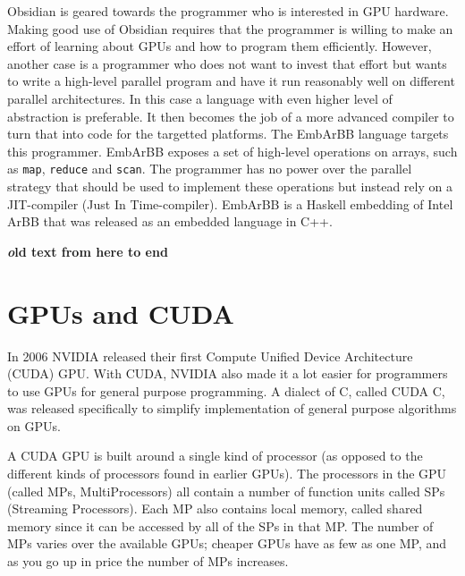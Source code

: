 \documentclass[a4paper]{book}
\begin{document}
Obsidian is geared towards the programmer who is interested in GPU hardware. Making 
good use of Obsidian requires that the programmer is willing to make an effort 
of learning about GPUs and how to program them efficiently. However, another case 
is a programmer who does not want to invest that effort but wants to write a high-level 
parallel program and have it run reasonably well on different parallel architectures. 
In this case a language with even higher level of abstraction is preferable. It then 
becomes the job of a more advanced compiler to turn that into code for the targetted 
platforms. The EmbArBB language targets this programmer. EmbArBB exposes a set of high-level 
operations on arrays, such as {\tt map}, {\tt reduce} and {\tt scan}. The programmer 
has no power over the parallel strategy that should be used to implement these 
operations but instead rely on a JIT-compiler (Just In Time-compiler). EmbArBB is a 
Haskell embedding of Intel ArBB that was released as an embedded language in C++. 


{\bf {\emph old text from here to end}}


%
%
\section{GPUs and CUDA} 

In 2006 NVIDIA released their first Compute Unified Device Architecture (CUDA) 
GPU. With CUDA, NVIDIA also made it a lot easier for programmers to use GPUs 
for general purpose programming. A dialect of C, called CUDA C, was released specifically 
to simplify implementation of general purpose algorithms on GPUs. 

A CUDA GPU is built around a single kind of processor (as opposed to the different 
kinds of processors found in earlier GPUs). The processors in the GPU (called MPs, 
MultiProcessors) all contain a number of function units called SPs (Streaming Processors). 
Each MP also contains local memory, called shared memory since it can be accessed 
by all of the SPs in that MP. The number of MPs varies over the available GPUs; cheaper 
GPUs have as few as one MP, and as you go up in price the number of MPs increases.
\end{document}
